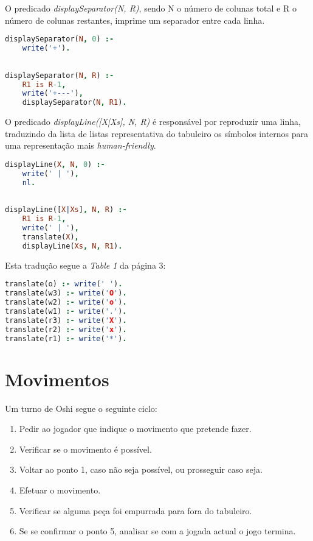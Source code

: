\documentclass[a4paper]{article}
\begin{document}
O predicado \textit{displaySeparator(N, R)}, sendo N o número de colunas total e R o número de colunas restantes, imprime um separador entre cada linha.

\begin{multicols}{2}
\begin{lstlisting}[language=Prolog]
displaySeparator(N, 0) :- 
	write('+').
	
	
displaySeparator(N, R) :- 
	R1 is R-1, 
	write('+---'), 
	displaySeparator(N, R1).
\end{lstlisting}
\end{multicols}

O predicado \textit{displayLine([X|Xs], N, R)} é responsável por reproduzir uma linha, traduzindo da lista de listas representativa do tabuleiro os símbolos internos para uma representação mais \textit{human-friendly}. 

\begin{multicols}{2}
\begin{lstlisting}[language=Prolog]
displayLine(X, N, 0) :- 
	write(' | '), 
	nl.
	
	
displayLine([X|Xs], N, R) :- 
	R1 is R-1, 
	write(' | '),
	translate(X),
	displayLine(Xs, N, R1).
\end{lstlisting}
\end{multicols}

Esta tradução segue a \textit{Table 1} da página 3:

\begin{multicols}{2}
\begin{lstlisting}[language=Prolog]
translate(o) :- write(' ').
translate(w3) :- write('O').
translate(w2) :- write('o').
translate(w1) :- write('.').
translate(r3) :- write('X').
translate(r2) :- write('x').
translate(r1) :- write('*').
\end{lstlisting}
\end{multicols}

\clearpage

\section{Movimentos}

Um turno de Oshi segue o seguinte ciclo:

\begin{enumerate}
	\item Pedir ao jogador que indique o movimento que pretende fazer.
	\item Verificar se o movimento é possível.
	\item Voltar ao ponto 1, caso não seja possível, ou prosseguir caso seja.
	\item Efetuar o movimento.
	\item Verificar se alguma peça foi empurrada para fora do tabuleiro.
	\item Se se confirmar o ponto 5, analisar se com a jogada actual o jogo termina.
\end{enumerate}
\end{document}
